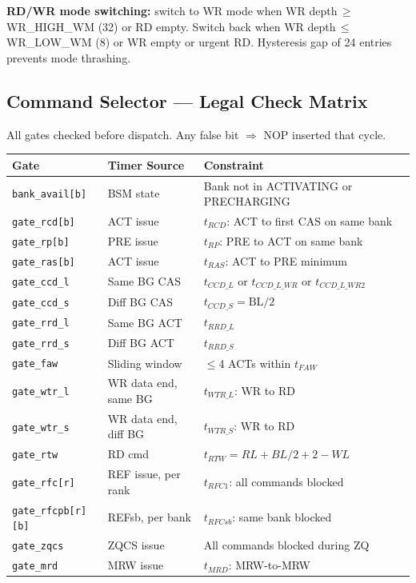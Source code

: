 \documentclass[10pt,a4paper]{article}
\newcommand{\Th}[1]{\cellcolor{thbg}\textbf{\small\color{acc1}#1}}
\newcommand{\RA}{\rowcolor{white}}
\newcommand{\RB}{\rowcolor{altbg}}
\begin{document}
\textbf{RD/WR mode switching:} switch to WR mode when WR depth\,$\geq$\,WR\_HIGH\_WM (32) or
RD empty. Switch back when WR depth\,$\leq$\,WR\_LOW\_WM (8) or WR empty or urgent RD.
Hysteresis gap of 24 entries prevents mode thrashing.

\subsection{Command Selector --- Legal Check Matrix}

All gates checked before dispatch. Any false bit $\Rightarrow$ NOP inserted that cycle.

\begin{center}
\begin{tabularx}{\linewidth}{@{} l l X @{}}
\toprule
\Th{Gate} & \Th{Timer Source} & \Th{Constraint} \\
\midrule
\RA \texttt{bank\_avail[b]}   & BSM state         & Bank not in ACTIVATING or PRECHARGING \\
\RB \texttt{gate\_rcd[b]}     & ACT issue         & $t_{RCD}$: ACT to first CAS on same bank \\
\RA \texttt{gate\_rp[b]}      & PRE issue         & $t_{RP}$: PRE to ACT on same bank \\
\RB \texttt{gate\_ras[b]}     & ACT issue         & $t_{RAS}$: ACT to PRE minimum \\
\RA \texttt{gate\_ccd\_l}     & Same BG CAS       & $t_{CCD\_L}$ or $t_{CCD\_L\_WR}$ or $t_{CCD\_L\_WR2}$ \\
\RB \texttt{gate\_ccd\_s}     & Diff BG CAS       & $t_{CCD\_S}=\text{BL}/2$ \\
\RA \texttt{gate\_rrd\_l}     & Same BG ACT       & $t_{RRD\_L}$ \\
\RB \texttt{gate\_rrd\_s}     & Diff BG ACT       & $t_{RRD\_S}$ \\
\RA \texttt{gate\_faw}        & Sliding window    & $\leq$4 ACTs within $t_{FAW}$ \\
\RB \texttt{gate\_wtr\_l}     & WR data end, same BG & $t_{WTR\_L}$: WR to RD \\
\RA \texttt{gate\_wtr\_s}     & WR data end, diff BG & $t_{WTR\_S}$: WR to RD \\
\RB \texttt{gate\_rtw}        & RD cmd            & $t_{RTW}=RL+BL/2+2-WL$ \\
\RA \texttt{gate\_rfc[r]}     & REF issue, per rank & $t_{RFC1}$: all commands blocked \\
\RB \texttt{gate\_rfcpb[r][b]}& REFsb, per bank   & $t_{RFCsb}$: same bank blocked \\
\RA \texttt{gate\_zqcs}       & ZQCS issue        & All commands blocked during ZQ \\
\RB \texttt{gate\_mrd}        & MRW issue         & $t_{MRD}$: MRW-to-MRW \\
\bottomrule
\end{tabularx}
\end{center}
\end{document}
